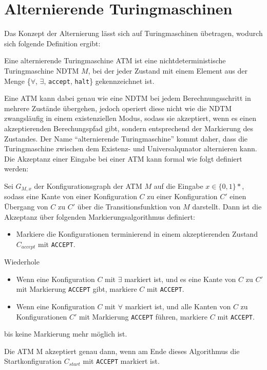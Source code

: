 \section{Alternierende Turingmaschinen} \label{section: alternierende Turingmaschine}
Das Konzept der Alternierung lässt sich auf Turingmaschinen übetragen, wodurch sich folgende Definition ergibt:
\begin{definition}\cite{pass_lecture_nodate}
    Eine alternierende Turingmaschine ATM ist eine nichtdeterministische Turingmaschine NDTM $M$, bei der jeder Zustand mit einem 
    Element aus der Menge \{$\forall$, $\exists$, \texttt{accept}, \texttt{halt}\} gekennzeichnet ist.
\end{definition}

Eine ATM kann dabei genau wie eine NDTM bei jedem Berechnungsschritt in mehrere Zustände übergehen, jedoch operiert diese nicht
wie die NDTM zwangsläufig in einem existenziellen Modus, sodass sie akzeptiert, wenn es einen akzeptierenden Berechungspfad gibt, sondern entsprechend der Markierung des Zustandes.
Der Name \enquote{alternierende Turingmaschine} kommt daher, dass die Turingmaschine zwischen dem Existenz- und Universalqunator alternieren kann.
Die Akzeptanz einer Eingabe bei einer ATM kann formal wie folgt definiert werden:
\begin{definition}\cite{arora_computational_2009}
    Sei $G_{M, x}$ der Konfigurationsgraph der ATM $M$ auf die Eingabe $x \in \{0,1\}*$, sodass eine Kante von einer Konfiguration $C$ zu 
    einer Konfiguration $C'$ einen Übergang von $C$ zu $C'$ über die Transitionsfunktion von $M$ darstellt. Dann ist die Akzeptanz über folgenden
    Markierungsalgorithmus definiert:

    \begin{itemize}
        \item Markiere die Konfigurationen terminierend in einem akzeptierenden Zustand $C_{accept}$ mit \texttt{ACCEPT}.
    \end{itemize}
    Wiederhole
    \begin{itemize}        
        \item Wenn eine Konfiguration $C$ mit $\exists$ markiert ist, und es eine Kante von $C$ zu $C'$ mit Markierung \texttt{ACCEPT} gibt, markiere $C$ mit \texttt{ACCEPT}.
        \item Wenn eine Konfiguration $C$ mit $\forall$ markiert ist, und alle Kanten von $C$ zu Konfigurationen $C'$ mit Markierung \texttt{ACCEPT} führen, markiere $C$ mit \texttt{ACCEPT}.
    \end{itemize}
    bis keine Markierung mehr möglich ist.

    Die ATM M akzeptiert genau dann, wenn am Ende dieses Algorithmus die Startkonfiguration $C_{start}$ mit \texttt{ACCEPT} markiert ist.
\end{definition}
